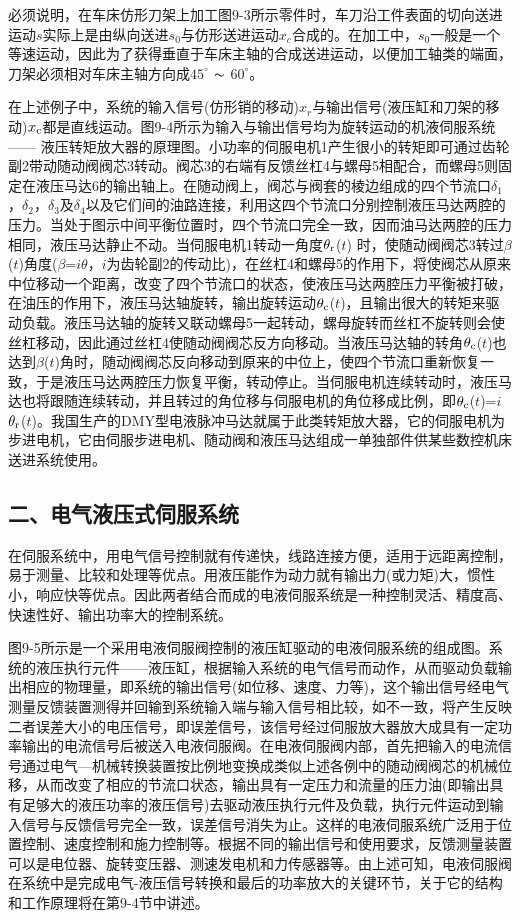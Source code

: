     必须说明，在车床仿形刀架上加工图9-3所示零件时，车刀沿工件表面的切向送进运动$s$实际上是由纵向送进$s_0$与仿形送进运动$x_c$合成的。在加工中，$s_0$一般是一个等速运动，因此为了获得垂直于车床主轴的合成送进运动，以便加工轴类的端面，刀架必须相对车床主轴方向成$45^{\circ}$ $\thicksim$ $60^{\circ}$。

    在上述例子中，系统的输入信号(仿形销的移动)$x_r$与输出信号(液压缸和刀架的移动)$x_{\rm c}$都是直线运动。图9-4所示为输入与输出信号均为旋转运动的机液伺服系统 —— 液压转矩放大器的原理图。小功率的伺服电机1产生很小的转矩即可通过齿轮副2带动随动阀阀芯3转动。阀芯3的右端有反馈丝杠4与螺母5相配合，而螺母5则固定在液压马达6的输出轴上。在随动阀上，阀芯与阀套的棱边组成的四个节流口$\delta_1$，$\delta_2$，$\delta_3$及$\delta_4$以及它们间的油路连接，利用这四个节流口分别控制液压马达两腔的压力。当处于图示中间平衡位置时，四个节流口完全一致，因而油马达两腔的压力相同，液压马达静止不动。当伺服电机1转动一角度$\theta_{\rm r}$($t$) 时，使随动阀阀芯3转过$\beta $($t$)角度($\beta $=$i\theta $，$i$为齿轮副2的传动比)，在丝杠4和螺母5的作用下，将使阀芯从原来中位移动一个距离，改变了四个节流口的状态，使液压马达两腔压力平衡被打破，在油压的作用下，液压马达轴旋转，输出旋转运动$\theta_{\rm c}$($t$)，且输出很大的转矩来驱动负载。液压马达轴的旋转又联动螺母5一起转动，螺母旋转而丝杠不旋转则会使丝杠移动，因此通过丝杠4使随动阀阀芯反方向移动。当液压马达轴的转角$\theta_{\rm c}$($t$)也达到$\beta$($t$)角时，随动阀阀芯反向移动到原来的中位上，使四个节流口重新恢复一致，于是液压马达两腔压力恢复平衡，转动停止。当伺服电机连续转动时，液压马达也将跟随连续转动，并且转过的角位移与伺服电机的角位移成比例，即$\theta_{\rm c}$($t$)=$i$$\theta_{\rm r}$($t$)。我国生产的DMY型电液脉冲马达就属于此类转矩放大器，它的伺服电机为步进电机，它由伺服步进电机、随动阀和液压马达组成一单独部件供某些数控机床送进系统使用。

\subsection{二、电气液压式伺服系统}

    在伺服系统中，用电气信号控制就有传递快，线路连接方便，适用于远距离控制，易于测量、比较和处理等优点。用液压能作为动力就有输出力(或力矩)大，惯性小，响应快等优点。因此两者结合而成的电液伺服系统是一种控制灵活、精度高、快速性好、输出功率大的控制系统。

    图9-5所示是一个采用电液伺服阀控制的液压缸驱动的电液伺服系统的组成图。系统的液压执行元件——液压缸，根据输入系统的电气信号而动作，从而驱动负载输出相应的物理量，即系统的输出信号(如位移、速度、力等)，这个输出信号经电气测量反馈装置测得并回输到系统输入端与输入信号相比较，如不一致，将产生反映二者误差大小的电压信号，即误差信号，该信号经过伺服放大器放大成具有一定功率输出的电流信号后被送入电液伺服阀。在电液伺服阀内部，首先把输入的电流信号通过电气—机械转换装置按比例地变换成类似上述各例中的随动阀阀芯的机械位移，从而改变了相应的节流口状态，输出具有一定压力和流量的压力油(即输出具有足够大的液压功率的液压信号)去驱动液压执行元件及负载，执行元件运动到输入信号与反馈信号完全一致，误差信号消失为止。这样的电液伺服系统广泛用于位置控制、速度控制和施力控制等。根据不同的输出信号和使用要求，反馈测量装置可以是电位器、旋转变压器、测速发电机和力传感器等。由上述可知，电液伺服阀在系统中是完成电气-液压信号转换和最后的功率放大的关键环节，关于它的结构和工作原理将在第9-4节中讲述。

